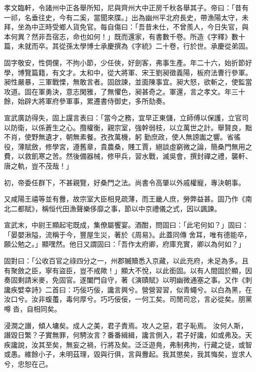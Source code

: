 \begin{pinyinscope}
 孝文臨軒，令諸州中正各舉所知，尼與齊州大中正房千秋各舉其子。帝曰：「昔有一祁，名垂往史，今有二奚，當聞來牒。」出為幽州平北府長史，帶漁陽太守，未拜，坐為中正時受鄉人貨免官。每自傷曰：「吾昔未仕，不曾羨人，今日失官，與本何異？然非吾宿志，命也如何！」既而還家，有書數千卷。所造《字釋》數十篇，未就而卒。其從孫太學博士承慶撰為《字統》二十卷，行於世。承慶從弟固。



 固字敬安，性倜儻，不拘小節，少任俠，好劍客，弗事生產。年二十六，始折節好學，博覽篇籍，有文才。太和中，從大將軍、宋王劉昶徵義陽，板府法曹行參軍。昶性嚴暴，三軍戰慄，無敢言者。固啟諫，並面陳事宜。昶大怒，欲斬之，使監當攻道。固在軍勇決，意志閑雅，了無懼色，昶甚奇之。軍還，言之孝文。年三十餘，始辟大將軍府參軍事，累遷書侍御史，多所劾奏。



 宣武廣訪得失，固上讜言表曰：「當今之務，宜早正東儲，立師傅以保護，立官司以防衛，以係蒼生之心。攬權衡，親宗室，強幹弱枝，以立萬世之計。舉賢良，黜不肖，使野無遺才，朝無素餐。孜孜萬機，躬
 勤庶政，使人無謗讟之響。省徭役，薄賦斂，修學宮，遵舊章，貴農桑，賤工賈，絕談虛窮微之論，簡桑門無用之費，以救飢寒之苦。然後備器械，修甲兵，習水戰，滅吳會，撰封禪之禮，襲軒、唐之軌，豈不茂哉！」



 初，帝委任群下，不甚親覽，好桑門之法。尚書令高肇以外戚權寵，專決朝事。



 又咸陽王禧等並有釁，故宗室大臣相見疏薄，而王畿人庶，勞弊益甚。固乃作《南北二都賦》，稱恒代田漁聲樂侈靡之事，節以中京禮儀之式，因以諷諫。



 宣武末，中尉王顯起宅既成，集僚屬饗宴。酒酣，問固曰：「此宅何如？」固曰：「晏嬰湫隘，流稱于今，豐屋生災，著於《周易》。此蓋同傳
 舍耳，唯有德能卒，願公勉之。」顯嘿然。他日又謂固曰：「吾作太府卿，府庫充實，卿以為何如？」



 固對曰：「公收百官之祿四分之一，州郡贓贖悉入京藏，以此充府，未足為多。且有聚斂之臣，寧有盜臣，豈不戒歟！」顯大不悅，以此銜固。以有人間固於顯，因奏固剩請米麥，免固官。遂闔門自守，著《演賾賦》以明幽微通塞之事。又作《刺讒疾嬖幸詩》二首曰：巧佞巧佞，讒言興兮。營營習習，似青蠅兮。以白為黑，在汝口兮。汝非蝮蠆，毒何厚兮。巧巧佞佞，一何工矣。司閒司忿，言必從矣。朋黨噂沓，自相同矣。



 浸潤之譖，傾人墉矣。成人之美，君子責焉。攻人之惡，君子恥焉。
 汝何人斯，譖毀日繁？子實無罪，何騁汝言？番番緝緝，讒言側入，君子好讒，如或弗及。天疾讒說，汝其至矣，無妄之禍，行將及矣。泛泛遊鳧，弗制弗拘，行藏之徒，或智或愚。維餘小子，未明茲理，毀與行俱，言與釁起。我其懲矣，我其悔矣，豈求人兮，忠恕在己。




\end{pinyinscope}
